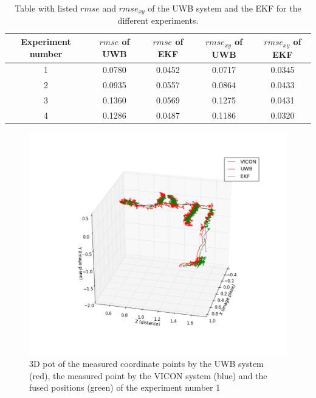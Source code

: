 \begin{table}[ht!]
\begin{center}
\begin{tabular}{c|c|c|c|c}
	Experiment number & $\textit{rmse}$ of \ac{UWB} & $\textit{rmse}$ of \ac{EKF} & $\textit{rmse}_{xy}$ of \ac{UWB} & $\textit{rmse}_{xy}$ of \ac{EKF}\\ 
	\hline 
	1 & 0.0780 & 0.0452 & 0.0717 & 0.0345 \\
	2 & 0.0935 & 0.0557 & 0.0864 & 0.0433 \\
	3 & 0.1360 & 0.0569 & 0.1275 & 0.0431 \\
	4 & 0.1286 & 0.0487 & 0.1186 & 0.0320
\end{tabular}
\end{center}
\caption{Table with listed $\textit{rmse}$ and $\textit{rmse}_{xy}$ of the \ac{UWB} system and the \ac{EKF} for the different experiments.}
\label{tab:results}
\end{table}

\begin{figure}[ht!]\centering
	\includegraphics[width=1.0\textwidth]{figures/evaluation}
	\caption{3D pot of the measured coordinate points by the \ac{UWB} system (red), the measured point by the VICON system (blue) and the fused positions (green) of the experiment number 1}\label{fig:evaluation}
\end{figure}
